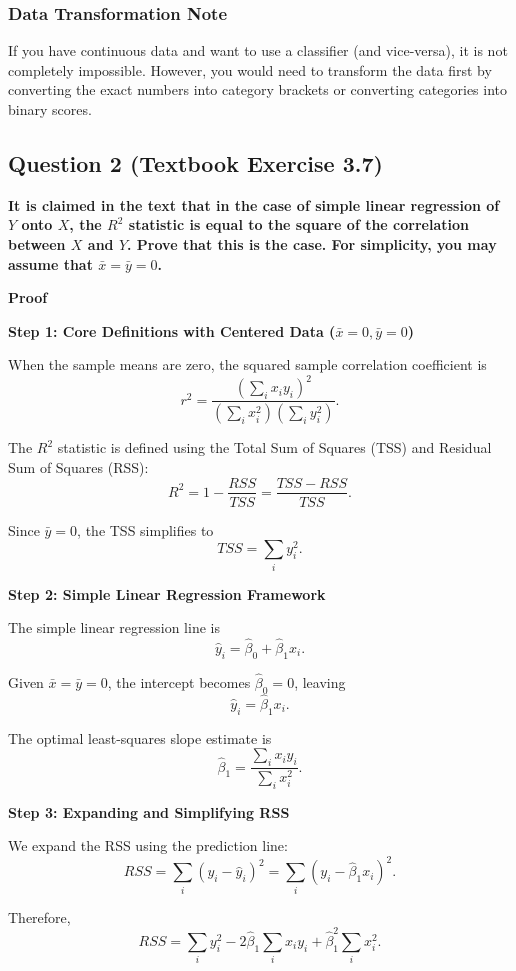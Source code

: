 \documentclass[12pt,a4paper]{article}
\begin{document}
\subsubsection*{Data Transformation Note}

If you have continuous data and want to use a classifier (and vice-versa), it is not completely impossible. However, you would need to transform the data first by converting the exact numbers into category brackets or converting categories into binary scores.

\subsection*{Question 2 (Textbook Exercise 3.7)}

\textbf{It is claimed in the text that in the case of simple linear regression of $Y$ onto $X$, the $R^2$ statistic is equal to the square of the correlation between $X$ and $Y$. Prove that this is the case. For simplicity, you may assume that $\bar{x}=\bar{y}=0$.}

\textbf{Proof}

\textbf{Step 1: Core Definitions with Centered Data ($\bar{x}=0,\bar{y}=0$)}

When the sample means are zero, the squared sample correlation coefficient is
\[
r^2 =
\frac{\left(\sum_i x_i y_i\right)^2}
{\left(\sum_i x_i^2\right)\left(\sum_i y_i^2\right)}.
\]

The $R^2$ statistic is defined using the Total Sum of Squares (TSS) and Residual Sum of Squares (RSS):
\[
R^2=1-\frac{RSS}{TSS}
=\frac{TSS-RSS}{TSS}.
\]

Since $\bar{y}=0$, the TSS simplifies to
\[
TSS=\sum_i y_i^2.
\]

\textbf{Step 2: Simple Linear Regression Framework}

The simple linear regression line is
\[
\hat{y}_i=\hat{\beta}_0+\hat{\beta}_1x_i.
\]

Given $\bar{x}=\bar{y}=0$, the intercept becomes $\hat{\beta}_0=0$, leaving
\[
\hat{y}_i=\hat{\beta}_1x_i.
\]

The optimal least-squares slope estimate is
\[
\hat{\beta}_1=
\frac{\sum_i x_i y_i}{\sum_i x_i^2}.
\]

\textbf{Step 3: Expanding and Simplifying RSS}

We expand the RSS using the prediction line:
\[
RSS=\sum_i(y_i-\hat{y}_i)^2
=\sum_i(y_i-\hat{\beta}_1x_i)^2.
\]

Therefore,
\[
RSS=
\sum_i y_i^2
-2\hat{\beta}_1\sum_i x_i y_i
+\hat{\beta}_1^2\sum_i x_i^2.
\]
\end{document}
